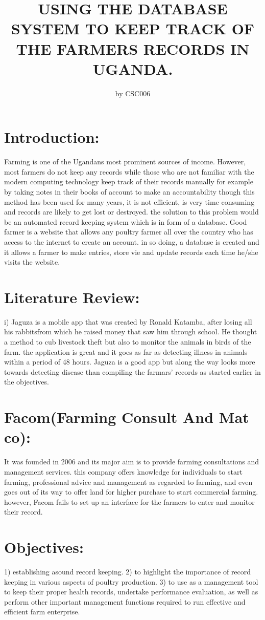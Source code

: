 \documentclass[10pt,letterpaper]{article}
\begin{document}
\title{USING THE DATABASE SYSTEM TO KEEP TRACK OF THE FARMERS RECORDS IN UGANDA.}
\author{by CSC006  }
\maketitle
\section{Introduction:}
Farming is one of the Ugandans most prominent sources of income. However, most farmers do not keep any records while those who are not familiar with the modern computing technology keep track of their records manually for example by taking notes in their books of account to make an accountability though this method has been used for many years, it is not efficient, is very time consuming and records are likely to get lost or destroyed. the solution to this problem would be an automated record keeping system which is in form of a database.
Good farmer is a website that allows any poultry farmer all over the country who has access to the internet to create an account. in so doing, a database is created and it allows a farmer to make entries, store vie and update records each time he/she visits the website. 
\section{Literature Review:}
i) Jaguza is a mobile app that was created by Ronald Katamba, after losing all his rabbitsfrom which he raised money that saw him through school. He thought a method to cub livestock theft but also to monitor the animals in birds of the farm.
the application is great and it goes as far as detecting illness in animals within a period of 48 hours.
Jaguza is a good app but along the way looks more towards detecting disease than compiling the farmars' records as started earlier in the objectives.    
\section{Facom(Farming Consult And Mat co):}
It was founded in 2006 and its major aim is to provide farming consultations and management services.
this company offers knowledge for individuals to start farming, professional advice and management as regarded to farming, and even goes out of its way to offer land for higher purchase to start commercial farming.
however, Facom fails to set up an interface for the farmers to enter and monitor their record.
\section{Objectives:}
1) establishing  asound record keeping.
2) to highlight the importance of record keeping in various aspects of poultry production.
3) to use as a management tool to keep their proper health records, undertake performance evaluation, as well as perform other important management functions required to run effective and efficient farm enterprise. 
\end{document}
